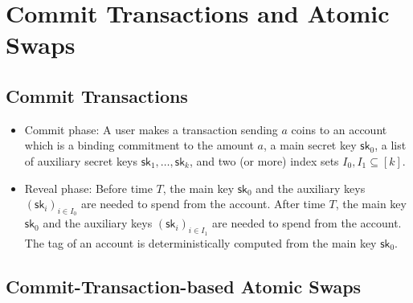 
\section{Commit Transactions and Atomic Swaps}

\subsection{Commit Transactions}

\begin{itemize}[topsep=0pt, itemsep=0pt, leftmargin=2em]
	\item Commit phase: A user makes a transaction sending $a$ coins to an account which is a binding commitment to the amount $a$, a main secret key $\mathsf{sk}_0$, a list of auxiliary secret keys $\mathsf{sk}_1, \dots, \mathsf{sk}_k$, and two (or more) index sets $I_0, I_1 \subseteq [k]$.
	\item Reveal phase: Before time $T$, the main key $\mathsf{sk}_0$ and the auxiliary keys $(\mathsf{sk}_i)_{i \in I_0}$ are needed to spend from the account. After time $T$, the main key $\mathsf{sk}_0$ and the auxiliary keys $(\mathsf{sk}_i)_{i \in I_1}$ are needed to spend from the account. The tag of an account is deterministically computed from the main key $\mathsf{sk}_0$.
\end{itemize}

\subsection{Commit-Transaction-based Atomic Swaps}

